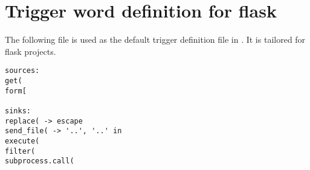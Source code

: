 \chapter{Trigger word definition for flask}\label{appendix:trigger_word_flask}
The following file is used as the default trigger definition file in \pyt{}.
It is tailored for flask projects.

\begin{lstlisting}[style=python, caption={Trigger word definition for flask projects}, label={flask_trigger_words}]
sources:
get(
form[

sinks:
replace( -> escape
send_file( -> '..', '..' in
execute(
filter(
subprocess.call(

\end{lstlisting}
